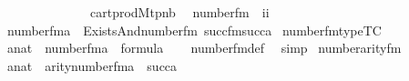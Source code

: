 \begin{isabellebody}
\ \ \ \ \ \ \ \ \ \ \ \ \ \ {\isasymand}\ cartprod{\isacharparenleft}{\kern0pt}M{\isacharcomma}{\kern0pt}t{\isacharcomma}{\kern0pt}p{}{\isacharcomma}{\kern0pt}nb{\isacharparenright}{\kern0pt}{\isachardoublequoteclose}\isanewline
\isanewline
{}\isamarkupfalse%
\isanewline
\ \ number{}{\isacharunderscore}{\kern0pt}fm\ {\isacharcolon}{\kern0pt}{\isacharcolon}{\kern0pt}\ {\isachardoublequoteopen}i{\isasymRightarrow}i{\isachardoublequoteclose}\ \isanewline
\ \ {\isachardoublequoteopen}number{}{\isacharunderscore}{\kern0pt}fm{\isacharparenleft}{\kern0pt}a{\isacharparenright}{\kern0pt}\ {\isasymequiv}\ Exists{\isacharparenleft}{\kern0pt}And{\isacharparenleft}{\kern0pt}number{}{\isacharunderscore}{\kern0pt}fm{\isacharparenleft}{\kern0pt}{}{\isacharparenright}{\kern0pt}{\isacharcomma}{\kern0pt}\ succ{\isacharunderscore}{\kern0pt}fm{\isacharparenleft}{\kern0pt}{}{\isacharcomma}{\kern0pt}succ{\isacharparenleft}{\kern0pt}a{\isacharparenright}{\kern0pt}{\isacharparenright}{\kern0pt}{\isacharparenright}{\kern0pt}{\isacharparenright}{\kern0pt}{\isachardoublequoteclose}\isanewline
\isanewline
{}\isamarkupfalse%
\ number{}{\isacharunderscore}{\kern0pt}fm{\isacharunderscore}{\kern0pt}type{\isacharbrackleft}{\kern0pt}TC{\isacharbrackright}{\kern0pt}\ {\isacharcolon}{\kern0pt}\isanewline
\ \ {\isachardoublequoteopen}a{\isasymin}nat\ {\isasymLongrightarrow}\ number{}{\isacharunderscore}{\kern0pt}fm{\isacharparenleft}{\kern0pt}a{\isacharparenright}{\kern0pt}\ {\isasymin}\ formula{\isachardoublequoteclose}\isanewline
%
\isadelimproof
\ \ %
\endisadelimproof
%
\isatagproof
{}\isamarkupfalse%
\ number{}{\isacharunderscore}{\kern0pt}fm{\isacharunderscore}{\kern0pt}def\ \isamarkupfalse%
\ simp%
\endisatagproof
{\isafoldproof}%
%
\isadelimproof
\isanewline
%
\endisadelimproof
\isanewline
{}\isamarkupfalse%
\ number{}arity{\isacharunderscore}{\kern0pt}{\isacharunderscore}{\kern0pt}fm\ {\isacharcolon}{\kern0pt}\isanewline
\ \ {\isachardoublequoteopen}a{\isasymin}nat\ {\isasymLongrightarrow}\ arity{\isacharparenleft}{\kern0pt}number{}{\isacharunderscore}{\kern0pt}fm{\isacharparenleft}{\kern0pt}a{\isacharparenright}{\kern0pt}{\isacharparenright}{\kern0pt}\ {\isacharequal}{\kern0pt}\ succ{\isacharparenleft}{\kern0pt}a{\isacharparenright}{\kern0pt}{\isachardoublequoteclose}\isanewline
%
\isadelimproof
\ \ %
\endisadelimproof
%
\isatagproof
{}\isamarkupfalse%

\end{isabellebody}
